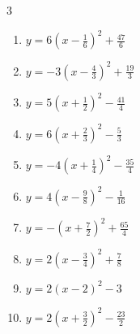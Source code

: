 \begin{multicols}{3}
\begin{enumerate}
        \phantom{$\displaystyle 頂点\left( 1 , 7 \right)$}

  \item $\displaystyle y=6\left( x-\frac{1}{6}\right)^{2}+\frac{47}{6}$


  \item $\displaystyle y=-3\left( x-\frac{4}{3}\right)^{2}+\frac{19}{3}$


  \item $\displaystyle y=5\left( x+\frac{1}{2}\right)^{2}-\frac{41}{4}$


  \item $\displaystyle y=6\left( x+\frac{2}{3}\right)^{2}-\frac{5}{3}$


  \item $\displaystyle y=-4\left( x+\frac{1}{4}\right)^{2}-\frac{35}{4}$


  \item $\displaystyle y=4\left( x-\frac{9}{8}\right)^{2}-\frac{1}{16}$


\columnbreak %

  \item $\displaystyle y=-\left( x+\frac{7}{2}\right)^{2}+\frac{65}{4}$


  \item $\displaystyle y=2\left( x-\frac{3}{4}\right)^{2}+\frac{7}{8}$


  \item $\displaystyle y=2\left( x-2\right)^{2}-3$

        \phantom{$\displaystyle 頂点\left( 2 , -3 \right)$}

  \item $\displaystyle y=2\left( x+\frac{3}{2}\right)^{2}-\frac{23}{2}$


\end{enumerate}
\end{multicols}
